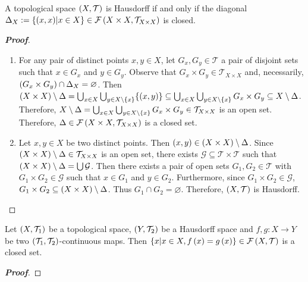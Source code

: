 \begin{proposition}
  A topological space $\left(X,\mathcal{T}\right)$ is Hausdorff if and only if the diagonal $\Delta_X:=\left\{\left(x,x\right)\middle|x\in X\right\}\in\mathcal{F}\left(X\times X,\mathcal{T}_{X\times X}\right)$ is closed.
  
  \begin{proof}[\rm\textbf{Proof}]
    \hfill
    \begin{enumerate}
      \item[\boxed{\Rightarrow}] For any pair of distinct points $x,y\in X$, let $G_x,G_y\in\mathcal{T}$ a pair of disjoint sets such that $x\in G_x$ and $y\in G_y$. Observe that $G_x\times G_y\in\mathcal{T}_{X\times X}$ and, necessarily, $\left(G_x\times G_y\right)\cap\Delta_X=\varnothing$. Then $\left(X\times X\right)\setminus\Delta=\bigcup_{x\in X}{\bigcup_{y\in X\setminus\left\{x\right\}}}{\left\{\left(x,y\right)\right\}}\subseteq\bigcup_{x\in X}{\bigcup_{y\in X\setminus\left\{x\right\}}{G_x\times G_y}}\subseteq X\setminus\Delta$. Therefore, $X\setminus\Delta=\bigcup_{x\in X}{\bigcup_{y\in X\setminus\left\{x\right\}}{G_x\times G_y}}\in\mathcal{T}_{X\times X}$ is an open set. Therefore, $\Delta\in\mathcal{F}\left(X\times X,\mathcal{T}_{X\times X}\right)$ is a closed set.
      
      \item[\boxed{\Leftarrow}] Let $x,y\in X$ be two distinct points. Then $\left(x,y\right)\in\left(X\times X\right)\setminus\Delta$. Since $\left(X\times X\right)\setminus\Delta\in\mathcal{T}_{X\times X}$ is an open set, there exists $\mathcal{G}\subseteq\mathcal{T}\times\mathcal{T}$ such that $\left(X\times X\right)\setminus\Delta=\bigcup{\mathcal{G}}$. Then there exists a pair of open sets $G_1,G_2\in\mathcal{T}$ with $G_1\times G_2\in\mathcal{G}$ such that $x\in G_1$ and $y\in G_2$. Furthermore, since $G_1\times G_2\in\mathcal{G}$, $G_1\times G_2\subseteq\left(X\times X\right)\setminus\Delta$. Thus $G_1\cap G_2=\varnothing$. Therefore, $\left(X,\mathcal{T}\right)$ is Hausdorff.
    \end{enumerate}
  \end{proof}
\end{proposition}

\begin{proposition}
  Let $\left(X,\mathcal{T}_1\right)$ be a topological space, $\left(Y,\mathcal{T}_2\right)$ be a Hausdorff space and $f,g:X\rightarrow Y$ be two $\left(\mathcal{T}_1,\mathcal{T}_2\right)$-continuous maps. Then $\left\{x\middle|x\in X,f\left(x\right)=g\left(x\right)\right\}\in\mathcal{F}\left(X,\mathcal{T}\right)$ is a closed set.

  \begin{proof}[\rm\textbf{Proof}]
    
  \end{proof}
\end{proposition}

